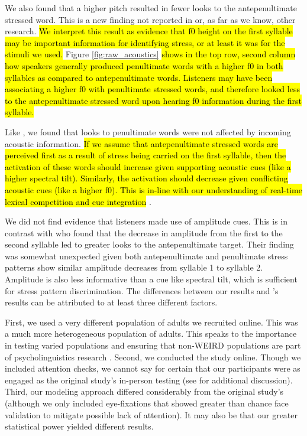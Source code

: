 We also found that a higher pitch resulted in fewer looks to the antepenultimate stressed word. This is a new finding not reported in \cite{Sulpizio_McQueen_2012} or, as far as we know, other research. \hl{We interpret this result as evidence that f0 height on the first syllable may be important information for identifying stress, or at least it was for the stimuli we used.} Figure \ref{fig:raw_acoustics} \hl{shows in the top row, second column how speakers generally produced penultimate words with a higher f0 in both syllables as compared to antepenultimate words. Listeners may have been associating a higher f0 with penultimate stressed words, and therefore looked less to the antepenultimate stressed word upon hearing f0 information during the first syllable.}

Like \cite{Sulpizio_McQueen_2012}, we found that looks to penultimate words were not affected by incoming acoustic information. \hl{If we assume that antepenultimate stressed words are perceived first as a result of stress being carried on the first syllable, then the activation of these words should increase given supporting acoustic cues (like a higher spectral tilt). Similarly, the activation should decrease given conflicting acoustic cues (like a higher f0). This is in-line with our understanding of real-time lexical competition and cue integration} \citep{Marslen1980, Kong2016, mcmurray_2008}.

We did not find evidence that listeners made use of amplitude cues. This is in contrast with \cite{Sulpizio_McQueen_2012} who found that the decrease in amplitude from the first to the second syllable led to greater looks to the antepenultimate target. Their finding was somewhat unexpected given both antepenultimate and penultimate stress patterns show similar amplitude decreases from syllable 1 to syllable 2. Amplitude is also less informative than a cue like spectral tilt, which is sufficient for stress pattern discrimination. The differences between our results and \cite{Sulpizio_McQueen_2012}'s results can be attributed to at least three different factors. 

First, we used a very different population of adults we recruited online. This was a much more heterogeneous population of adults. This speaks to the importance in testing varied populations and ensuring that non-WEIRD populations are part of psycholinguistics research \citep{frost2021investigating}. Second, we conducted the study online. Though we included attention checks, we cannot say for certain that our participants were as engaged as the original study's in-person testing (see \cite{rodd2024moving} for additional discussion). Third, our modeling approach differed considerably from the original study's (although we only included eye-fixations that showed greater than chance face validation to mitigate possible lack of attention). It may also be that our greater statistical power yielded different results. 

